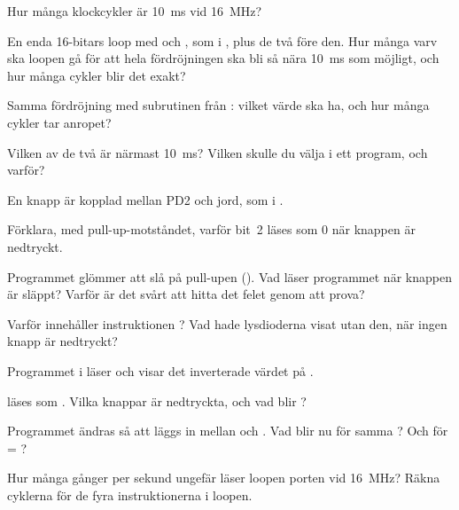 \label{c10:ex:6}
\begin{parts}
  \item Hur många klockcykler är 10~ms vid 16~MHz?
  \item En enda 16-bitars loop med  och , som i , plus de två
     före den. Hur många varv  ska loopen gå för att hela fördröjningen ska bli så
    nära 10~ms som möjligt, och hur många cykler blir det exakt?
  \item Samma fördröjning med subrutinen  från : vilket värde ska
     ha, och hur många cykler tar anropet?
  \item Vilken av de två är närmast 10~ms? Vilken skulle du välja i ett program, och varför?
\end{parts}

\label{c10:ex:7}
En knapp är kopplad mellan PD2 och jord, som i .
\begin{parts}
  \item Förklara, med pull-up-motståndet, varför  bit~2 läses som 0 när knappen är
    nedtryckt.
  \item Programmet glömmer att slå på pull-upen (). Vad läser programmet när
    knappen är släppt? Varför är det svårt att hitta det felet genom att prova?
  \item Varför innehåller  instruktionen ? Vad hade lysdioderna
    visat utan den, när ingen knapp är nedtryckt?
\end{parts}

\label{c10:ex:8}
Programmet i  läser  och visar det inverterade värdet på .
\begin{parts}
  \item {} läses som . Vilka knappar är nedtryckta, och vad blir
    ?
  \item Programmet ändras så att  läggs in mellan  och .
    Vad blir  nu för samma ? Och för  = ?
  \item Hur många gånger per sekund ungefär läser loopen porten vid 16~MHz? Räkna cyklerna för de
    fyra instruktionerna i loopen.
\end{parts}

